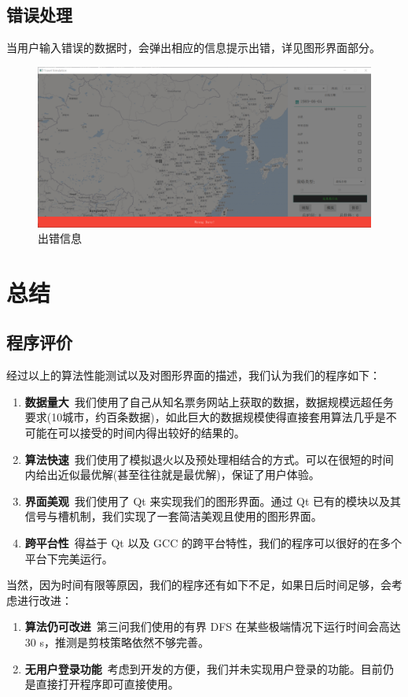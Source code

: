 \documentclass[lang=cn,blue,13pt]{elegantbook}
\begin{document}
\section{错误处理}
当用户输入错误的数据时，会弹出相应的信息提示出错，详见图形界面部分。

\begin{figure}[!htbp]
	\centering
	\includegraphics[width=.8\textwidth]{exception.png}
	\caption{出错信息}
	\label{error}
\end{figure}

\chapter{总结}

\section{程序评价}
经过以上的算法性能测试以及对图形界面的描述，我们认为我们的程序如下：

\begin{enumerate}
	\item \textbf{数据量大}\ 我们使用了自己从知名票务网站上获取的数据，数据规模远超任务要求(10城市，约百条数据)，如此巨大的数据规模使得直接套用算法几乎是不可能在可以接受的时间内得出较好的结果的。
	\item \textbf{算法快速}\ 我们使用了模拟退火以及预处理相结合的方式。可以在很短的时间内给出近似最优解(甚至往往就是最优解)，保证了用户体验。
	\item \textbf{界面美观}\ 我们使用了 Qt 来实现我们的图形界面。通过 Qt 已有的模块以及其信号与槽机制，我们实现了一套简洁美观且使用的图形界面。
	\item \textbf{跨平台性}\ 得益于 Qt 以及 GCC 的跨平台特性，我们的程序可以很好的在多个平台下完美运行。
\end{enumerate}

当然，因为时间有限等原因，我们的程序还有如下不足，如果日后时间足够，会考虑进行改进：

\begin{enumerate}
	\item \textbf{算法仍可改进}\ 第三问我们使用的有界 DFS 在某些极端情况下运行时间会高达 30 s，推测是剪枝策略依然不够完善。
	\item \textbf{无用户登录功能}\ 考虑到开发的方便，我们并未实现用户登录的功能。目前仍是直接打开程序即可直接使用。
\end{enumerate}
\end{document}
